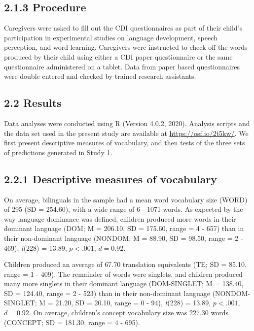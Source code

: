 \documentclass[
  english,
  ,man,floatsintext]{apa6}
\begin{document}
\hypertarget{procedure}{%
\subsection{2.1.3 Procedure}\label{procedure}}

Caregivers were asked to fill out the CDI questionnaires as part of their child's participation in experimental studies on language development, speech perception, and word learning. Caregivers were instructed to check off the words produced by their child using either a CDI paper questionnaire or the same questionnaire administered on a tablet. Data from paper based questionnaires were double entered and checked by trained research assistants.

\hypertarget{results}{%
\subsection{2.2 Results}\label{results}}

Data analyses were conducted using R (Version 4.0.2, 2020). Analysis scripts and the data set used in the present study are available at \url{https://osf.io/2t5kw/}. We first present descriptive measures of vocabulary, and then tests of the three sets of predictions generated in Study 1.

\hypertarget{descriptive-measures-of-vocabulary}{%
\subsection{2.2.1 Descriptive measures of vocabulary}\label{descriptive-measures-of-vocabulary}}

On average, bilinguals in the sample had a mean word vocabulary size (WORD) of 295 (SD = 254.60), with a wide range of 6 - 1071 words. As expected by the way language dominance was defined, children produced more words in their dominant language (DOM; M = 206.10, SD = 175.60, range = 4 - 657) than in their non-dominant language (NONDOM; M = 88.90, SD = 98.50, range = 2 - 469), \emph{t}(228) = 13.89, \(p < .001\), \(d = 0.92\).

Children produced an average of 67.70 translation equivalents (TE; SD = 85.10, range = 1 - 409). The remainder of words were singlets, and children produced many more singlets in their dominant language (DOM-SINGLET; M = 138.40, SD = 124.40, range = 2 - 523) than in their non-dominant language (NONDOM-SINGLET; M = 21.20, SD = 20.10, range = 0 - 94), \emph{t}(228) = 13.89, \(p < .001\), \(d = 0.92\). On average, children's concept vocabulary size was 227.30 words (CONCEPT; SD = 181.30, range = 4 - 695).
\end{document}
